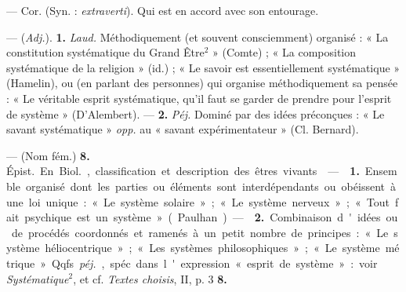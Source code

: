 \begin{itemize}[leftmargin=1cm, label=, itemsep=1pt]
 — Cor. (Syn. : {\it extraverti}). Qui est en accord avec son
entourage.

 — ({\it Adj.}). {\bf 1.} {\it Laud.} Méthodiquement (et
souvent consciemment) organisé : « La constitution systématique du Grand
Être$^2$ » (Comte) ; « La composition systématique de la religion » (id.) ;
« Le savoir est essentiellement systématique » (Hamelin), ou (en parlant des
personnes) qui organise méthodiquement sa pensée : « Le véritable esprit
systématique, qu'il faut se garder de prendre pour l'esprit de système
» (D'Alembert). — {\bf 2.} {\it Péj.} Dominé par des idées préconçues : « Le
savant systématique » {\it opp.} au « savant expérimentateur » (Cl. Bernard).

— (Nom fém.) {\bf 8.} \si{Épist.} En \si{Biol.}, classification et
description des êtres vivants.

 —  {\bf 1.} Ensemble organisé dont les parties
ou éléments sont interdépendants ou obéissent à une loi unique : « Le
système solaire »; « Le système nerveux »; « Tout fait psychique est un
système » (Paulhan). —  {\bf 2.} Combinaison d'idées ou de
procédés coordonnés et ramenés à un petit nombre de principes : « Le système
héliocentrique »; « Les systèmes philosophiques »; « Le système métrique »
Qqfs. {\it péj.}, spéc. dans l'expression « esprit de système » : voir {\it
Systématique}$^2$, et cf. {\it Textes choisis}, II, p. 3 {\bf 8.}

	\end{itemize}
